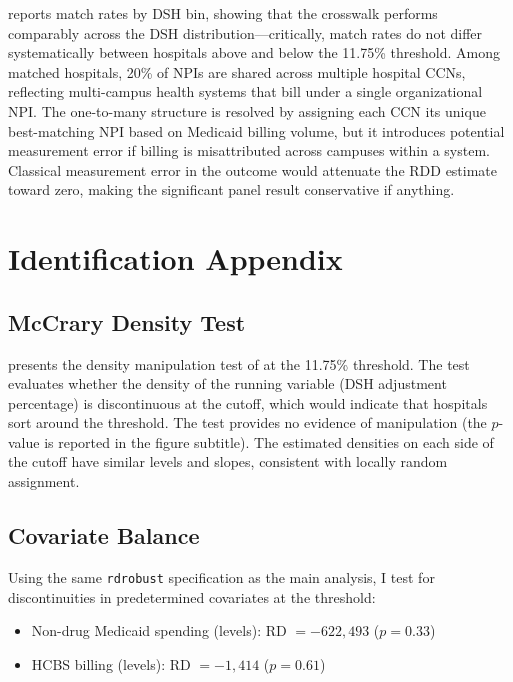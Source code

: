 \documentclass[12pt]{article}
\begin{document}
 reports match rates by DSH bin, showing that the crosswalk performs comparably across the DSH distribution---critically, match rates do not differ systematically between hospitals above and below the 11.75\% threshold. Among matched hospitals, 20\% of NPIs are shared across multiple hospital CCNs, reflecting multi-campus health systems that bill under a single organizational NPI. The one-to-many structure is resolved by assigning each CCN its unique best-matching NPI based on Medicaid billing volume, but it introduces potential measurement error if billing is misattributed across campuses within a system. Classical measurement error in the outcome would attenuate the RDD estimate toward zero, making the significant panel result conservative if anything.


\section{Identification Appendix}
\label{app:id}

\subsection{McCrary Density Test}

 presents the density manipulation test of \citet{cattaneo2020simple} at the 11.75\% threshold. The test evaluates whether the density of the running variable (DSH adjustment percentage) is discontinuous at the cutoff, which would indicate that hospitals sort around the threshold. The test provides no evidence of manipulation (the $p$-value is reported in the figure subtitle). The estimated densities on each side of the cutoff have similar levels and slopes, consistent with locally random assignment.

\subsection{Covariate Balance}

Using the same \texttt{rdrobust} specification as the main analysis, I test for discontinuities in predetermined covariates at the threshold:

\begin{itemize}
\item Non-drug Medicaid spending (levels): RD $= -622{,}493$ ($p = 0.33$)
\item HCBS billing (levels): RD $= -1{,}414$ ($p = 0.61$)
\end{itemize}
\end{document}
